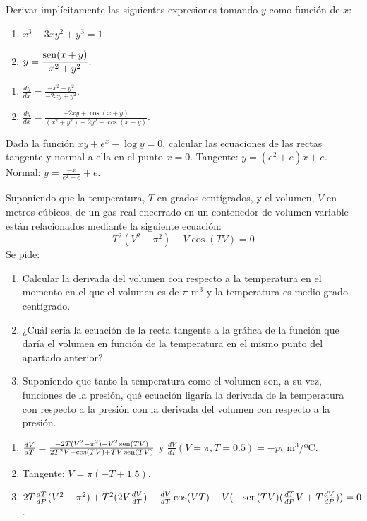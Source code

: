 
{Derivar implícitamente las siguientes expresiones tomando $y$ como función de $x$:
\begin{multicols}{2}
\begin{enumerate}
\item $x^3-3xy^2+y^3=1$.
\item $y=\dfrac{\operatorname{sen}(x+y)}{x^2+y^2}$.
\end{enumerate}
\end{multicols}
}
{\begin{enumerate}
\item $\frac{dy}{dx}=\frac{-x^2+y^2}{-2xy+y^2}.$
\item $\frac{dy}{dx}=\frac{-2xy+\cos(x+y)}{(x^2+y^2)+2y^2-\cos(x+y)}.$
\end{enumerate}
}
{
}


{Dada la función $xy+e^x-\log y=0$, calcular las ecuaciones de las rectas tangente y normal a ella en el punto $x=0$.
}
{Tangente: $y=(e^2+e)x+e$. Normal: $y=\frac{-x}{e^2+e}+e$.
}
{
}


{Suponiendo que la temperatura, $T$ en grados centí­grados, y
el volumen, $V$ en metros cúbicos, de un gas real encerrado en un
contenedor de volumen variable están relacionados mediante la
siguiente ecuación:
\[
T^2 \left( {V^2  - \pi ^2 } \right) - V\cos \left( {TV} \right) = 0
\]
Se pide:
\begin{enumerate}
\item Calcular la derivada del volumen con respecto a la temperatura
en el momento en el que el volumen es de $\pi$ m$^3$ y la
temperatura es medio grado centí­grado.

\item ¿Cuál serí­a la ecuación de la recta tangente a la gráfica de la
función que darí­a el volumen en función de la temperatura en el
mismo punto del apartado anterior?
\item Suponiendo que tanto la temperatura como el volumen son, a su vez, funciones de la presión, qué ecuación ligaría la derivada de la temperatura con respecto a la presión con la derivada del volumen con respecto a la presión.
\end{enumerate}
}
{\begin{enumerate}
\item $\frac{dV}{dT} = \frac{-2T(V^2-\pi^2)-V^2\operatorname{sen}(TV)}{2T^2V-\cos(TV)+TV\operatorname{sen}(TV)}$ y $\frac{dV}{dT}(V=\pi,T=0.5)= -pi$ m$^3$/ºC.
\item Tangente: $V=\pi(-T+1.5)$.
\item $2T\frac{dT}{dP}(V^2-\pi^2)+T^2(2V\frac{dV}{dT})-\frac{dV}{dT}\cos(VT)-V(-\operatorname{sen}(TV)(\frac{dT}{dP}V+T\frac{dV}{dP})) =0$.
\end{enumerate}
}
{
}


